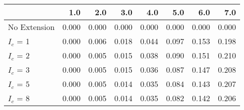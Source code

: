 \begin{tabular}{lrrrrrrr}
\toprule
{} &   1.0 &   2.0 &   3.0 &   4.0 &   5.0 &   6.0 &   7.0 \\
\midrule
No Extension & 0.000 & 0.000 & 0.000 & 0.000 & 0.000 & 0.000 & 0.000 \\
$I_c$ = 1    & 0.000 & 0.006 & 0.018 & 0.044 & 0.097 & 0.153 & 0.198 \\
$I_c$ = 2    & 0.000 & 0.005 & 0.015 & 0.038 & 0.090 & 0.151 & 0.210 \\
$I_c$ = 3    & 0.000 & 0.005 & 0.015 & 0.036 & 0.087 & 0.147 & 0.208 \\
$I_c$ = 5    & 0.000 & 0.005 & 0.014 & 0.035 & 0.084 & 0.143 & 0.207 \\
$I_c$ = 8    & 0.000 & 0.005 & 0.014 & 0.035 & 0.082 & 0.142 & 0.206 \\
\bottomrule
\end{tabular}
